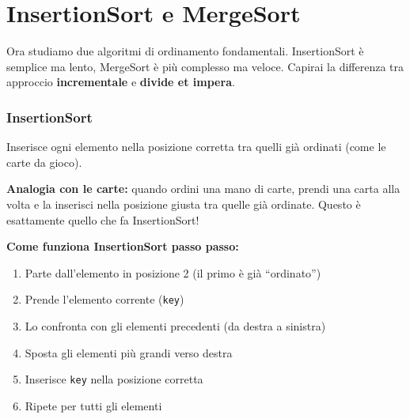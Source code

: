 	\section{InsertionSort e MergeSort}

\begin{softnote}
	Ora studiamo due algoritmi di ordinamento fondamentali. InsertionSort è semplice ma lento, MergeSort è più complesso ma veloce. Capirai la differenza tra approccio \textbf{incrementale} e \textbf{divide et impera}.
\end{softnote}

\subsubsection{InsertionSort}

Inserisce ogni elemento nella posizione corretta tra quelli già ordinati
(come le carte da gioco).

\begin{nota}
	\textbf{Analogia con le carte:} quando ordini una mano di carte, prendi una carta alla volta e la inserisci nella posizione giusta tra quelle già ordinate. Questo è esattamente quello che fa InsertionSort!
\end{nota}

\begin{algorithm}
	\caption{InsertionSort}
\end{algorithm}

\begin{softnote}
	\textbf{Come funziona InsertionSort passo passo:}
	
	\begin{enumerate}
		\item Parte dall'elemento in posizione 2 (il primo è già ``ordinato'')
		\item Prende l'elemento corrente (\texttt{key})
		\item Lo confronta con gli elementi precedenti (da destra a sinistra)
		\item Sposta gli elementi più grandi verso destra
		\item Inserisce \texttt{key} nella posizione corretta
		\item Ripete per tutti gli elementi
	\end{enumerate}
\end{softnote}

